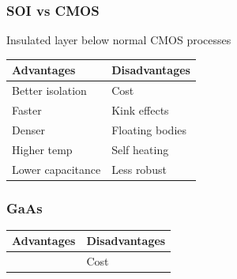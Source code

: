 \documentclass[a4paper,twocolumn]{article}
\begin{document}
			\subsubsection{SOI vs CMOS}
				Insulated layer below normal CMOS processes
				\begin{table}[ht]
					\centering
					\begin{tabular}{ll}
					Advantages & Disadvantages \\
					\hline
					Better isolation & Cost \\
					Faster & Kink effects \\
					Denser & Floating bodies \\
					Higher temp & Self heating \\
					Lower capacitance & Less robust \\
					\end{tabular}
				\end{table}
			\subsubsection{GaAs}
				\begin{table}[ht]
					\centering
					\begin{tabular}{ll}
					Advantages & Disadvantages \\
					\hline
					& Cost \\
					\end{tabular}
				\end{table}
\end{document}
